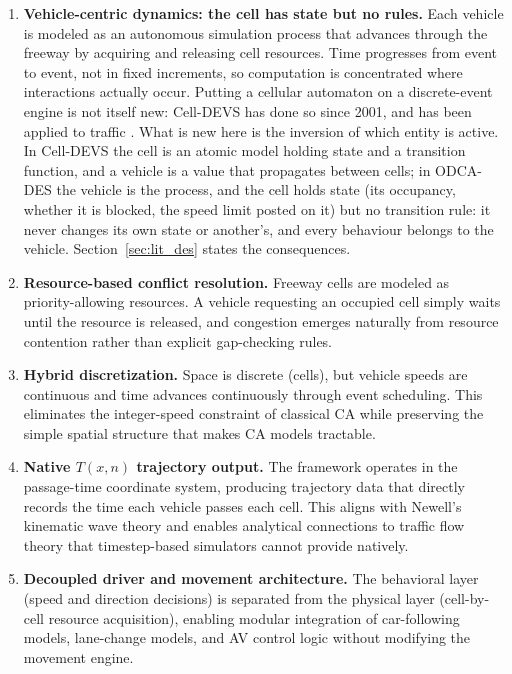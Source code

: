 \documentclass[review,number]{elsarticle}
\begin{document}
\begin{enumerate}
    \renewcommand{\theenumi}{\roman{enumi}}\renewcommand{\labelenumi}{\theenumi)}
    \item \textbf{Vehicle-centric dynamics: the cell has state but no rules.} Each vehicle is modeled as an autonomous simulation process that advances through the freeway by acquiring and releasing cell resources. Time progresses from event to event, not in fixed increments, so computation is concentrated where interactions actually occur. Putting a cellular automaton on a discrete-event engine is not itself new: Cell-DEVS \citep{wainer2001timed,wainer2014cellular} has done so since 2001, and has been applied to traffic \citep{davidson2000specifying,wainer2006atlas}. What is new here is the inversion of which entity is active. In Cell-DEVS the cell is an atomic model holding state and a transition function, and a vehicle is a value that propagates between cells; in ODCA-DES the vehicle is the process, and the cell holds state (its occupancy, whether it is blocked, the speed limit posted on it) but no transition rule: it never changes its own state or another's, and every behaviour belongs to the vehicle. Section~\ref{sec:lit_des} states the consequences.

    \item \textbf{Resource-based conflict resolution.} Freeway cells are modeled as priority-allowing resources. A vehicle requesting an occupied cell simply waits until the resource is released, and congestion emerges naturally from resource contention rather than explicit gap-checking rules.

    \item \textbf{Hybrid discretization.} Space is discrete (cells), but vehicle speeds are continuous and time advances continuously through event scheduling. This eliminates the integer-speed constraint of classical CA while preserving the simple spatial structure that makes CA models tractable.

    \item \textbf{Native $T(x,n)$ trajectory output.} The framework operates in the passage-time coordinate system, producing trajectory data that directly records the time each vehicle passes each cell. This aligns with Newell's kinematic wave theory \citep{newell1993simplified} and enables analytical connections to traffic flow theory that timestep-based simulators cannot provide natively.

    \item \textbf{Decoupled driver and movement architecture.} The behavioral layer (speed and direction decisions) is separated from the physical layer (cell-by-cell resource acquisition), enabling modular integration of car-following models, lane-change models, and AV control logic without modifying the movement engine.


\end{enumerate}
\end{document}
